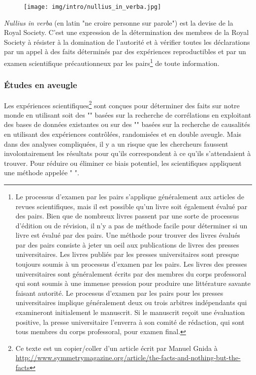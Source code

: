 	\begin{figure}[H]
		\centering
		\texttt{[image: img/intro/nullius\_in\_verba.jpg]}
	\end{figure}
	\textit{Nullius in verba} (en latin "ne croire personne sur parole") est la devise de la Royal Society. C'est une expression de la détermination des membres de la Royal Society à résister à la domination de l'autorité et à vérifier toutes les déclarations par un appel à des faits déterminés par des expériences reproductibles et par un examen scientifique précautionneux par les pairs\footnote{Le processus d'examen par les pairs s'applique généralement aux articles de revues scientifiques, mais il est possible qu'un livre soit également évalué par des pairs. Bien que de nombreux livres passent par une sorte de processus d'édition ou de révision, il n'y a pas de méthode facile pour déterminer si un livre est évalué par des pairs. Une méthode pour trouver des livres évalués par des pairs consiste à jeter un oeil aux publications de livres des presses universitaires. Les livres publiés par les presses universitaires sont presque toujours soumis à un processus d'examen par les pairs. Les livres des presses universitaires sont généralement écrits par des membres du corps professoral qui sont soumis à une immense pression pour produire une littérature savante faisant autorité. Le processus d'examen par les pairs pour les presses universitaires implique généralement deux ou trois arbitres indépendants qui examineront initialement le manuscrit. Si le manuscrit reçoit une évaluation positive, la presse universitaire l'enverra à son comité de rédaction, qui sont tous membres du corps professoral, pour examen final.} de toute information.

	\subsubsection{\'Etudes en aveugle}
	Les exp\'eriences scientifiques\footnote{Ce texte est un copier/coller d'un article \'ecrit par Manuel Gnida à \url{http://www.symmetrymagazine.org/article/the-facts-and-nothing-but-the-facts}} sont conçues pour d\'eterminer des faits sur notre monde en utilisant soit des "" bas\'ees sur la recherche de corr\'elations en exploitant des bases de donn\'ees existantes ou sur des "" bas\'ees sur la recherche de causalit\'es en utilisant des exp\'eriences contrôl\'ees, randomis\'ees et en double aveugle. Mais dans des analyses compliqu\'ees, il y a un risque que les chercheurs faussent involontairement les r\'esultats pour qu'ils correspondent à ce qu'ils s'attendaient à trouver. Pour r\'eduire ou \'eliminer ce biais potentiel, les scientifiques appliquent une m\'ethode appel\'ee " ".
	
